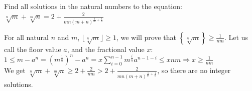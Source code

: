 \begin{problem}
    Find all solutions in the natural numbers to the equation: \( \sqrt[n]{m} + \sqrt[m]{n} = 2 + \frac{2}{mn\left(m+n\right)^{\frac{1}{m} + \frac{1}{n}}} \)
\end{problem}
\begin{solution}
    For all natural \( n \) and \( m \), \( \lfloor\sqrt[n]{m}\rfloor \geq 1 \), we will prove that \( \left\{\sqrt[n]{m}\right\} \geq \frac{1}{nm} \). Let us call the floor value \( a \), and the fractional value \( x \):\\
    \( 1\leq m-a^n = \left(m^\frac{1}{n}\right)^n - a^n = x \sum_{i=0}^{n-1} m^{\frac{i}{n}} a^{n-1-i} \leq xnm \Rightarrow x \geq \frac{1}{nm} \)\\
    We get \( \sqrt[n]{m} + \sqrt[m]{n} \geq 2 + \frac{2}{nm} > 2 + \frac{2}{mn\left(m+n\right)^{\frac{1}{m} + \frac{1}{n}}} \), so there are no integer solutions.
\end{solution}
